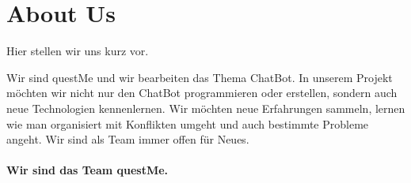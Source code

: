 \section{About Us}
Hier stellen wir uns kurz vor.
\\
\begin{center}
\end{center}
Wir sind questMe und wir bearbeiten das Thema ChatBot.
In unserem Projekt möchten wir nicht nur den ChatBot programmieren oder erstellen, sondern auch neue Technologien kennenlernen.
Wir möchten neue Erfahrungen sammeln, lernen wie man organisiert mit Konflikten umgeht und auch bestimmte Probleme angeht.
Wir sind als Team immer offen für Neues.
\\
\\
\textbf{Wir sind das Team questMe.}

